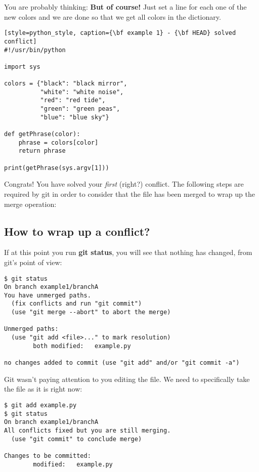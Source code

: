 You are probably thinking: {\bf But of course!} Just set a line for each one of the new colors and we are done so that
we get all colors in the dictionary.

\begin{lstlisting}[style=python_style, caption={\bf example 1} - {\bf HEAD} solved conflict]
#!/usr/bin/python

import sys

colors = {"black": "black mirror",
          "white": "white noise",
          "red": "red tide",
          "green": "green peas",
          "blue": "blue sky"}

def getPhrase(color):
    phrase = colors[color]
    return phrase

print(getPhrase(sys.argv[1]))
\end{lstlisting}

Congrats! You have solved your {\it first} (right?) conflict. The following steps are required by git in order
to consider that the file has been merged to wrap up the merge operation:

\subsection{How to wrap up a conflict?}

If at this point you run {\bf git status}, you will see that nothing has changed, from git's point of view:

\begin{lstlisting}[style=console_style, caption={\bf git status} after solving the conflict]
$ git status
On branch example1/branchA
You have unmerged paths.
  (fix conflicts and run "git commit")
  (use "git merge --abort" to abort the merge)

Unmerged paths:
  (use "git add <file>..." to mark resolution)
        both modified:   example.py

no changes added to commit (use "git add" and/or "git commit -a")
\end{lstlisting}

Git wasn't paying attention to you editing the file. We need to specifically take the file as it is right now:

\begin{lstlisting}[style=console_style, caption={\bf git add; git status}]
$ git add example.py 
$ git status
On branch example1/branchA
All conflicts fixed but you are still merging.
  (use "git commit" to conclude merge)

Changes to be committed:
        modified:   example.py
\end{lstlisting}

